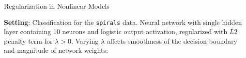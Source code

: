 \begin{frame}{Regularization in Nonlinear Models}

\small
\textbf{Setting}: Classification for the \texttt{spirals} data.
Neural network with single hidden layer containing 10 neurons and logistic 
output activation, regularized with $L2$ penalty term for $\lambda > 0$.
Varying $\lambda$ affects smoothness of the decision boundary and magnitude of 
network weights:

\vfill


\end{frame}
